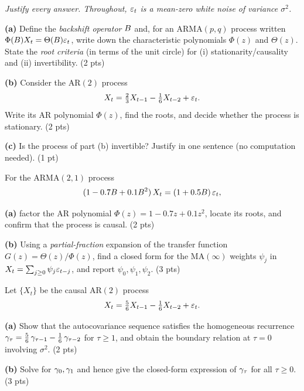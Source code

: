 \documentclass[11pt]{article}
\begin{document}
\pointstable
\begin{center}\itshape Justify every answer. Throughout, $\varepsilon_t$ is a mean-zero white noise of variance $\sigma^2$.\end{center}

\textbf{(a)} Define the \emph{backshift operator} $B$ and, for an $\mathrm{ARMA}(p,q)$ process written $\Phi(B)X_t=\Theta(B)\varepsilon_t$, write down the characteristic polynomials $\Phi(z)$ and $\Theta(z)$. State the \emph{root criteria} (in terms of the unit circle) for (i) stationarity/causality and (ii) invertibility. \hfill(2 pts)

\textbf{(b)} Consider the $\mathrm{AR}(2)$ process
\[
X_t=\tfrac23 X_{t-1}-\tfrac16 X_{t-2}+\varepsilon_t .
\]
Write its AR polynomial $\Phi(z)$, find the roots, and decide whether the process is stationary. \hfill(2 pts)

\textbf{(c)} Is the process of part (b) invertible? Justify in one sentence (no computation needed). \hfill(1 pt)
\answerpage

For the $\mathrm{ARMA}(2,1)$ process
\[
(1-0.7B+0.1B^2)\,X_t=(1+0.5B)\,\varepsilon_t,
\]

\textbf{(a)} factor the AR polynomial $\Phi(z)=1-0.7z+0.1z^2$, locate its roots, and confirm that the process is causal. \hfill(2 pts)

\textbf{(b)} Using a \emph{partial-fraction} expansion of the transfer function $G(z)=\Theta(z)/\Phi(z)$, find a closed form for the $\mathrm{MA}(\infty)$ weights $\psi_j$ in $X_t=\sum_{j\ge0}\psi_j\varepsilon_{t-j}$, and report $\psi_0,\psi_1,\psi_2$. \hfill(3 pts)
\answerpage

Let $\{X_t\}$ be the causal $\mathrm{AR}(2)$ process
\[
X_t=\tfrac56 X_{t-1}-\tfrac16 X_{t-2}+\varepsilon_t .
\]

\textbf{(a)} Show that the autocovariance sequence satisfies the homogeneous recurrence
$\gamma_\tau=\tfrac56\,\gamma_{\tau-1}-\tfrac16\,\gamma_{\tau-2}$ for $\tau\ge1$, and obtain the boundary relation at $\tau=0$ involving $\sigma^2$. \hfill(2 pts)

\textbf{(b)} Solve for $\gamma_0,\gamma_1$ and hence give the closed-form expression of $\gamma_\tau$ for all $\tau\ge0$. \hfill(3 pts)
\end{document}
